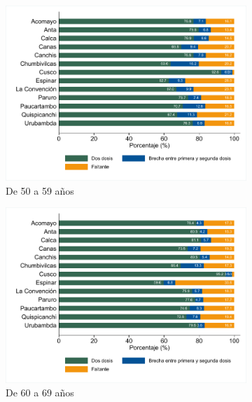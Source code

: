 \documentclass[12pt,a4paper,openany]{book}
\begin{document}
\begin{figure}[h]
\begin{subfigure}[b]{0.45\textwidth}
		\includegraphics[width=\textwidth]{../figuras/vacunacion_provincial_edad_5}
		\caption{De 50 a 59 años}
	\end{subfigure}
	\hfill
	\begin{subfigure}[b]{0.45\textwidth}
		\centering
		\includegraphics[width=\textwidth]{../figuras/vacunacion_provincial_edad_6}
		\caption{De 60 a 69 años}
	\end{subfigure}
\begin{subfigure}[b]{0.45\textwidth}
	\centering

\end{subfigure}
\end{figure}
\end{document}
